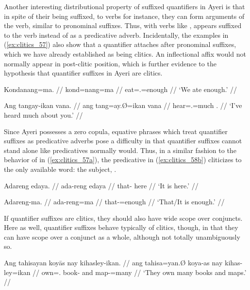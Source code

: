 Another interesting distributional property of suffixed quantifiers in Ayeri is
that in spite of their being suffixed, to verbs for instance, they can form
arguments of the verb, similar to pronominal suffixes. Thus, with verbs like
,  appears suffixed to the verb
instead of as a predicative adverb. Incidentally, the examples in
(\ref{ex:clitics_57}) also show that a quantifier attaches after pronominal
suffixes, which we have already established as being clitics. An inflectional
affix would not normally appear in post-clitic position, which is further
evidence to the hypothesis that quantifier suffixes in Ayeri are clitics.

\pex\label{ex:clitics_57}
\a\label{ex:clitics_57a}\begingl
	\gla Kondanang=ma. //
	\glb kond=nang=ma //
	\glc eat=\Fpl{}.\Aarg{}=enough //
	\glft `We ate enough.' //
\endgl

\a\label{ex:clitics_57b}\begingl
	\gla Ang tangay-ikan vana. //
	\glb ang tang=ay.Ø=ikan vana //
	\glc \AgtT{} hear=\Fsg{}.\Top{}=much \Second{}.\Gen{} //
	\glft `I've heard much about you.' //
\endgl
\xe

Since Ayeri possesses a zero copula, equative phrases which treat quantifier
suffixes as predicative adverbs pose a difficulty in that quantifier suffixes
cannot stand alone like predicatives normally would. Thus, in a similar fashion
to the behavior of  in (\ref{ex:clitics_57a}),
the predicative  in (\ref{ex:clitics_58b}) cliticizes to the only
available word: the subject, .

\pex\label{ex:clitics_58}
\a\label{ex:clitics_58a}\begingl
	\gla Adareng edaya. //
	\glb ada-reng edaya //
	\glc that-\AargI{} here //
	\glft `It is here.' //
\endgl

\a\label{ex:clitics_58b}\begingl
	\gla Adareng-ma. //
	\glb ada-reng=ma //
	\glc that-\AargI{}=enough //
	\glft `That/It is enough.' //
\endgl
\xe

If quantifier suffixes are clitics, they should also have wide scope over
conjuncts. Here as well, quantifier suffixes behave typically of clitics,
though, in that they can have scope over a conjunct as a whole, although not
totally unambiguously so.

\pex\label{ex:clitics_59}
\a\label{ex:clitics_59a}\begingl
	\gla Ang tahisayan koyās nay kihasley-ikan. //
	\glb ang tahisa=yan.Ø koya-as nay kihas-ley=ikan //
	\glc \AgtT{} own=\TplM{}.\Top{} book-\Parg{} and map-\PargI{}=many //
	\glft `They own many books and maps.' //
\endgl

